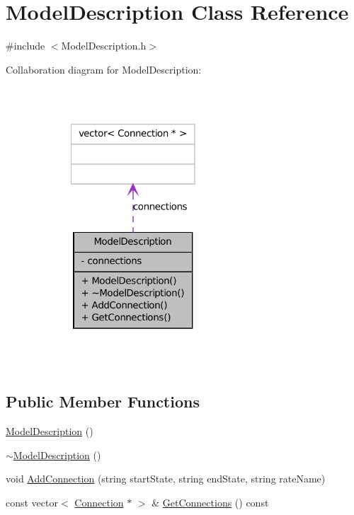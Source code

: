 \hypertarget{classModelDescription}{
\section{ModelDescription Class Reference}
\label{classModelDescription}
}


{\ttfamily \#include $<$ModelDescription.h$>$}



Collaboration diagram for ModelDescription:\nopagebreak
\begin{figure}[H]
\begin{center}
\leavevmode
\includegraphics[width=210pt]{classModelDescription__coll__graph}
\end{center}
\end{figure}
\subsection*{Public Member Functions}
\begin{DoxyCompactItemize}
\item 
\hyperlink{classModelDescription_a7a1da1ba67e855968da674ec6a4e1d7a}{ModelDescription} ()
\item 
\hyperlink{classModelDescription_aae623832121ffc4ff0130012ca4b26a9}{$\sim$ModelDescription} ()
\item 
void \hyperlink{classModelDescription_a5eb05482f951226fe696d227cb5a60ff}{AddConnection} (string startState, string endState, string rateName)
\item 
const vector$<$ \hyperlink{classConnection}{Connection} $\ast$ $>$ \& \hyperlink{classModelDescription_a3849c1b405db870a7306aa00ceb625b4}{GetConnections} () const 
\end{DoxyCompactItemize}
